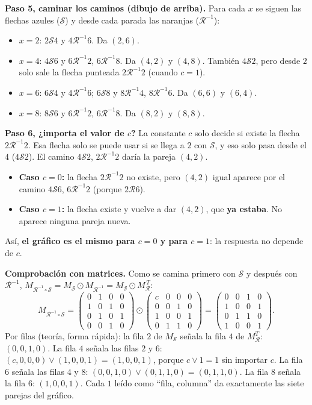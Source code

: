 \documentclass[11pt]{article}
\newcommand{\R}{\mathcal{R}}
\newcommand{\Sr}{\mathcal{S}}
\begin{document}
\begin{explica}
\textbf{Paso 5, caminar los caminos (dibujo de arriba).} Para cada $x$ se siguen las flechas azules ($\Sr$) y desde cada parada las naranjas ($\R^{-1}$):
\begin{itemize}[leftmargin=1.3em,itemsep=1pt]
\item $x=2$: $2\Sr4$ y $4\R^{-1}6$. Da $(2,6)$.
\item $x=4$: $4\Sr6$ y $6\R^{-1}2$, $6\R^{-1}8$. Da $(4,2)$ y $(4,8)$. También $4\Sr2$, pero desde $2$ solo sale la flecha punteada $2\R^{-1}2$ (cuando $c=1$).
\item $x=6$: $6\Sr4$ y $4\R^{-1}6$; $6\Sr8$ y $8\R^{-1}4$, $8\R^{-1}6$. Da $(6,6)$ y $(6,4)$.
\item $x=8$: $8\Sr6$ y $6\R^{-1}2$, $6\R^{-1}8$. Da $(8,2)$ y $(8,8)$.
\end{itemize}

\textbf{Paso 6, ¿importa el valor de $c$?} La constante $c$ solo decide si existe la flecha $2\R^{-1}2$. Esa flecha solo se puede usar si se llega a $2$ con $\Sr$, y eso solo pasa desde el $4$ ($4\Sr2$). El camino $4\Sr2$, $2\R^{-1}2$ daría la pareja $(4,2)$.
\begin{itemize}[leftmargin=1.3em,itemsep=1pt]
\item \textbf{Caso $c=0$:} la flecha $2\R^{-1}2$ no existe, pero $(4,2)$ igual aparece por el camino $4\Sr6$, $6\R^{-1}2$ (porque $2\R6$).
\item \textbf{Caso $c=1$:} la flecha existe y vuelve a dar $(4,2)$, que \textbf{ya estaba}. No aparece ninguna pareja nueva.
\end{itemize}
Así, \textbf{el gráfico es el mismo para $c=0$ y para $c=1$}: la respuesta no depende de $c$.
\end{explica}

\textbf{Comprobación con matrices.} Como se camina primero con $\Sr$ y después con $\R^{-1}$, $M_{\R^{-1}\circ\Sr}=M_\Sr\odot M_{\R^{-1}}=M_\Sr\odot M_\R^{\,T}$:
\[
M_{\R^{-1}\circ\Sr}=
\begin{pmatrix}0&1&0&0\\1&0&1&0\\0&1&0&1\\0&0&1&0\end{pmatrix}\odot
\begin{pmatrix}c&0&0&0\\0&0&1&0\\1&0&0&1\\0&1&1&0\end{pmatrix}
=\begin{pmatrix}0&0&1&0\\1&0&0&1\\0&1&1&0\\1&0&0&1\end{pmatrix}.
\]
Por filas (teoría, forma rápida): la fila $2$ de $M_\Sr$ señala la fila $4$ de $M_\R^T$: $(0,0,1,0)$. La fila $4$ señala las filas $2$ y $6$: $(c,0,0,0)\vee(1,0,0,1)=(1,0,0,1)$, porque $c\vee1=1$ sin importar $c$. La fila $6$ señala las filas $4$ y $8$: $(0,0,1,0)\vee(0,1,1,0)=(0,1,1,0)$. La fila $8$ señala la fila $6$: $(1,0,0,1)$. Cada $1$ leído como ``fila, columna'' da exactamente las siete parejas del gráfico.
\end{document}
